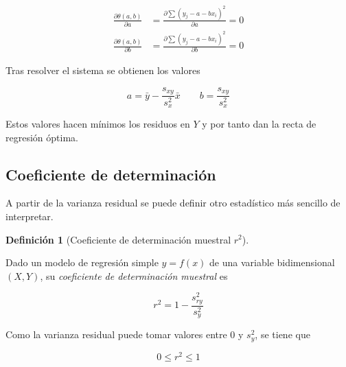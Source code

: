 \documentclass[
  spanish,
  a4paper,
]{scrreport}
\theoremstyle{plain}
\theoremstyle{definition}
\theoremstyle{definition}
\newtheorem{definition}{Definición}[chapter]
\theoremstyle{remark}
\begin{document}
\begin{align*}
\frac{\partial \theta(a,b)}{\partial a} &=  \frac{\partial \sum (y_j-a-bx_i)^2 }{\partial a} =0\\
\frac{\partial \theta(a,b)}{\partial b} &=  \frac{\partial \sum (y_j-a-bx_i)^2 }{\partial b} =0
\end{align*}

Tras resolver el sistema se obtienen los valores

\[
a= \bar y - \frac{s_{xy}}{s_x^2}\bar x \qquad b=\frac{s_{xy}}{s_x^2}
\]

Estos valores hacen mínimos los residuos en \(Y\) y por tanto dan la
recta de regresión óptima.

\subsection{Coeficiente de
determinación}\label{coeficiente-de-determinaciuxf3n}

A partir de la varianza residual se puede definir otro estadístico más
sencillo de interpretar.

\begin{definition}[Coeficiente de determinación muestral
\(r^2\)]\protect\hypertarget{def-coeficiente-determinacion}{}\label{def-coeficiente-determinacion}

Dado un modelo de regresión simple \(y=f(x)\) de una variable
bidimensional \((X,Y)\), su \emph{coeficiente de determinación muestral}
es

\[r^2 = 1- \frac{s_{ry}^2}{s_y^2}\]

\end{definition}

\begin{tcolorbox}[enhanced jigsaw, arc=.35mm, bottomrule=.15mm, bottomtitle=1mm, breakable, colback=white, colbacktitle=quarto-callout-warning-color!10!white, colframe=quarto-callout-warning-color-frame, coltitle=black, left=2mm, leftrule=.75mm, opacityback=0, opacitybacktitle=0.6, rightrule=.15mm, title=\textcolor{quarto-callout-warning-color}{\faExclamationTriangle}\hspace{0.5em}{Advertencia}, titlerule=0mm, toprule=.15mm, toptitle=1mm]

Como la varianza residual puede tomar valores entre 0 y \(s_y^2\), se
tiene que

\[0\leq r^2\leq 1\]

\end{tcolorbox}
\end{document}
